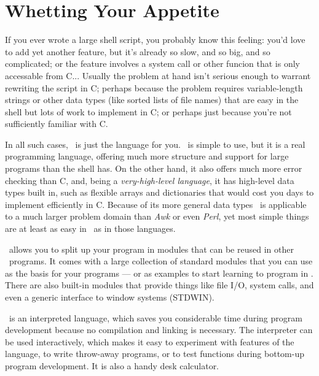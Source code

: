 \pagebreak

\tableofcontents

\pagebreak


\section{Whetting Your Appetite}

If you ever wrote a large shell script, you probably know this feeling:
you'd love to add yet another feature, but it's already so slow, and so
big, and so complicated; or the feature involves a system call or other
funcion that is only accessable from C...
Usually the problem at hand isn't serious enough to warrant rewriting
the script in C; perhaps because the problem requires variable-length
strings or other data types (like sorted lists of file names) that
are easy in the shell but lots of work to implement in C; or perhaps
just because you're not sufficiently familiar with C.

In all such cases, \Python\ is just the language for you.
\Python\ is simple to use, but it is a real programming language, offering
much more structure and support for large programs than the shell has.
On the other hand, it also offers much more error checking than C, and,
being a
{\it very-high-level language},
it has high-level data types built in, such as flexible arrays and
dictionaries that would cost you days to implement efficiently in C.
Because of its more general data types \Python\ is applicable to a
much larger problem domain than
{\it Awk}
or even
{\it Perl},
yet most simple things are at least as easy in \Python\ as in those
languages.

\Python\ allows you to split up your program in modules that can be reused
in other \Python\ programs.
It comes with a large collection of standard modules that you can use as
the basis for your programs --- or as examples to start learning to
program in \Python.
There are also built-in modules that provide things like file I/O,
system calls, and even a generic interface to window systems (STDWIN).

\Python\ is an interpreted language, which saves you considerable time
during program development because no compilation and linking is
necessary.
The interpreter can be used interactively, which makes it easy to
experiment with features of the language, to write throw-away programs,
or to test functions during bottom-up program development.
It is also a handy desk calculator.


